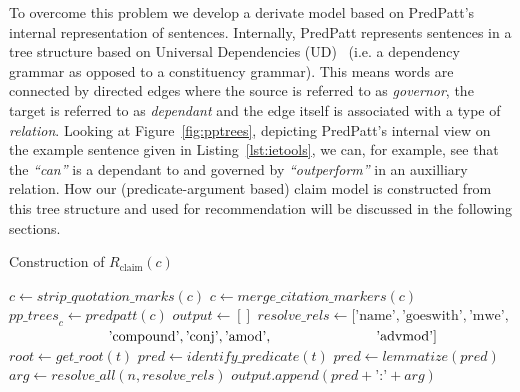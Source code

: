To overcome this problem we develop a derivate model based on PredPatt's internal representation of sentences. Internally, PredPatt represents sentences in a tree structure based on Universal Dependencies (UD)~\cite{Nivre2016} (i.e. a dependency grammar as opposed to a constituency grammar). This means words are connected by directed edges where the source is referred to as \emph{governor}, the target is referred to as \emph{dependant} and the edge itself is associated with a type of \emph{relation}. Looking at Figure~\ref{fig:pptrees}, depicting PredPatt's internal view on the example sentence given in Listing~\ref{lst:ietools}, we can, for example, see that the \emph{``can''} is a dependant to and governed by \emph{``outperform''} in an auxilliary relation. How our (predicate-argument based) claim model is constructed from this tree structure and used for recommendation will be discussed in the following sections.

\begin{algorithm}
\caption{Construction of $R_{\text{claim}}(c)$}
\label{alg:pprep}
\begin{algorithmic}
    \State $c \gets \mathit{strip\_quotation\_marks}(c)$     
    \State $c \gets \mathit{merge\_citation\_markers}(c)$     
    \State $\mathit{pp\_trees}_c \gets \mathit{predpatt}(c)$     
    \State $\mathit{output} \gets []$     %
    \State $\mathit{resolve\_rels} \gets [\text{'name'},\text{'goeswith'},\text{'mwe'},$     
    \State $\hphantom{\mathit{resolve\_rels} \gets [}\text{'compound'},\text{'conj'},\text{'amod'},$
    \State $\hphantom{\mathit{resolve\_rels} \gets [}\text{'advmod'}]$
       
        \State $\mathit{root} \gets \mathit{get\_root}(t)$   %
        \State $\mathit{pred} \gets \mathit{identify\_predicate}(t)$   
        \State $\mathit{pred} \gets \mathit{lemmatize}(\mathit{pred})$   %
                \State $\mathit{arg} \gets \mathit{resolve\_all}(n, \mathit{resolve\_rels})$   
                \State $\mathit{output.append}(\mathit{pred}+\text{':'}+\mathit{arg})$   
            \EndIf
        \EndFor
    \EndFor\\
\end{algorithmic}
\end{algorithm}

